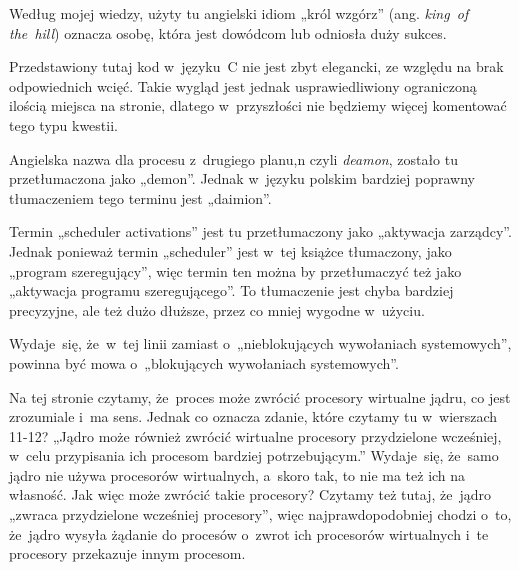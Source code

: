 \documentclass[a4paper,11pt]{article}
\numberwithin{equation}{section}
\begin{document}
\VerSpaceFour





\noindent
{} Według mojej wiedzy, użyty tu angielski idiom „król
wzgórz” (ang. \textit{king~of the~hill}) oznacza osobę, która jest dowódcom
lub odniosła duży sukces.

\VerSpaceFour





\noindent
{} Przedstawiony tutaj kod w~języku~C nie jest zbyt elegancki, ze
względu na brak odpowiednich wcięć. Takie wygląd jest jednak
usprawiedliwiony ograniczoną ilością miejsca na stronie, dlatego
w~przyszłości nie będziemy więcej komentować tego typu kwestii.

\VerSpaceFour





\noindent
{} Angielska nazwa dla procesu z~drugiego planu,n czyli
\textit{deamon}, zostało tu przetłumaczona jako „demon”. Jednak w~języku
polskim bardziej poprawny tłumaczeniem tego terminu jest „daimion”.

\VerSpaceFour





\noindent
{} Termin „scheduler activations” jest tu przetłumaczony
jako „aktywacja zarządcy”. Jednak ponieważ termin „scheduler” jest w~tej
książce tłumaczony, jako „program szeregujący”, więc termin ten można by
przetłumaczyć też jako „aktywacja programu szeregującego”. To tłumaczenie
jest chyba bardziej precyzyjne, ale też dużo dłuższe, przez co mniej wygodne
w~użyciu.

\VerSpaceFour





\noindent
{} Wydaje~się, że~w~tej linii zamiast o~„nieblokujących
wywołaniach systemowych”, powinna być mowa o~„blokujących wywołaniach
systemowych”.

\VerSpaceFour





\noindent
{} Na tej stronie czytamy, że~proces może zwrócić
procesory wirtualne jądru, co jest zrozumiale i~ma sens. Jednak co oznacza
zdanie, które czytamy tu w~wierszach 11-12? „Jądro może również zwrócić
wirtualne procesory przydzielone wcześniej, w~celu przypisania ich procesom
bardziej potrzebującym.” Wydaje~się, że~samo jądro nie używa procesorów
wirtualnych, a~skoro tak, to nie ma też ich na własność. Jak więc może
zwrócić takie procesory? Czytamy też tutaj, że~jądro „zwraca przydzielone
wcześniej procesory”, więc najprawdopodobniej chodzi o~to, że~jądro
wysyła żądanie do procesów o~zwrot ich procesorów wirtualnych i~te procesory
przekazuje innym procesom.
\end{document}
